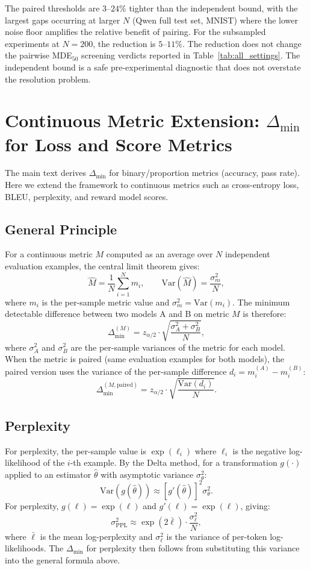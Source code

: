 \documentclass[pdflatex,sn-mathphys-ay,oneside]{sn-jnl}
\theoremstyle{thmstylethree}
\begin{document}
The paired thresholds are $3$--$24\%$ tighter than the independent bound, with the largest gaps occurring at larger $N$ (Qwen full test set, MNIST) where the lower noise floor amplifies the relative benefit of pairing. For the subsampled experiments at $N=200$, the reduction is $5$--$11\%$. The reduction does not change the pairwise MDE$_{50}$ screening verdicts reported in Table~\ref{tab:all_settings}. The independent bound is a safe pre-experimental diagnostic that does not overstate the resolution problem.

\section{Continuous Metric Extension: $\Delta_{\min}$ for Loss and Score Metrics}\label{app:continuous}

The main text derives $\Delta_{\min}$ for binary/proportion metrics (accuracy, pass rate). Here we extend the framework to continuous metrics such as cross-entropy loss, BLEU, perplexity, and reward model scores.

\subsection{General Principle}

For a continuous metric $M$ computed as an average over $N$ independent evaluation examples, the central limit theorem gives:
\[
\hat M = \frac{1}{N}\sum_{i=1}^N m_i, \qquad \mathrm{Var}(\hat M) = \frac{\sigma_m^2}{N},
\]
where $m_i$ is the per-sample metric value and $\sigma_m^2 = \mathrm{Var}(m_i)$. The minimum detectable difference between two models A and B on metric $M$ is therefore:
\[
\Delta_{\min}^{(M)} = z_{\alpha/2} \cdot \sqrt{\frac{\sigma_A^2 + \sigma_B^2}{N}},
\]
where $\sigma_A^2$ and $\sigma_B^2$ are the per-sample variances of the metric for each model. When the metric is paired (same evaluation examples for both models), the paired version uses the variance of the per-sample difference $d_i = m_i^{(A)} - m_i^{(B)}$:
\[
\Delta_{\min}^{(M,\text{paired})} = z_{\alpha/2} \cdot \sqrt{\frac{\mathrm{Var}(d_i)}{N}}.
\]

\subsection{Perplexity}

For perplexity, the per-sample value is $\exp(\ell_i)$ where $\ell_i$ is the negative log-likelihood of the $i$-th example. By the Delta method, for a transformation $g(\cdot)$ applied to an estimator $\hat\theta$ with asymptotic variance $\sigma_\theta^2$:
\[
\mathrm{Var}(g(\hat\theta)) \approx [g'(\hat\theta)]^2 \sigma_\theta^2.
\]
For perplexity, $g(\ell) = \exp(\ell)$ and $g'(\ell) = \exp(\ell)$, giving:
\[
\sigma_{\text{PPL}}^2 \approx \exp(2\bar\ell) \cdot \frac{\sigma_\ell^2}{N},
\]
where $\bar\ell$ is the mean log-perplexity and $\sigma_\ell^2$ is the variance of per-token log-likelihoods. The $\Delta_{\min}$ for perplexity then follows from substituting this variance into the general formula above.
\end{document}
